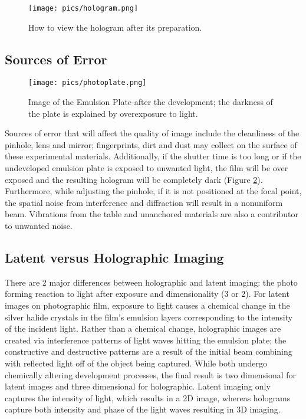 \documentclass[12pt, letterpaper, twoside]{article}
\begin{document}
\begin{figure}[!ht]
    \centering
    \texttt{[image: pics/hologram.png]}
    \caption{How to view the hologram after its preparation.}
    \label{fig:my_label}
\end{figure}

\subsection{Sources of Error}

\begin{figure}[!ht]
    \centering
    \texttt{[image: pics/photoplate.png]}
    \caption{Image of the Emulsion Plate after the development; the darkness of the plate is explained by overexposure to light.}
    \label{fig:plate}
\end{figure}

Sources of error that will affect the quality of image include the cleanliness of the pinhole, lens and mirror; fingerprints, dirt and dust may collect on the surface of these experimental materials. Additionally, if the shutter time is too long or if the undeveloped emulsion plate is exposed to unwanted light, the film will be over exposed and the resulting hologram will be completely dark (Figure \ref{fig:plate}). Furthermore, while adjusting the pinhole, if it is not positioned at the focal point, the spatial noise from interference and diffraction will result in a nonuniform beam. Vibrations from the table and unanchored materials are also a contributor to unwanted noise. 

\subsection{Latent versus Holographic Imaging}

There are 2 major differences between holographic and latent imaging: the photo forming reaction to light after exposure and dimensionality (3 or 2). For latent images on photographic film, exposure to light causes a chemical change in the silver halide crystals in the film's emulsion layers corresponding to the intensity of the incident light. Rather than a chemical change, holographic images are created via interference patterns of light waves hitting the emulsion plate; the constructive and destructive patterns are a result of the initial beam combining with reflected light off of the object being captured. While both undergo chemically altering development processes, the final result is two dimensional for latent images and three dimensional for holographic. Latent imaging only captures the intensity of light, which results in a 2D image, whereas holograms capture both intensity and phase of the light waves resulting in 3D imaging.
\end{document}
